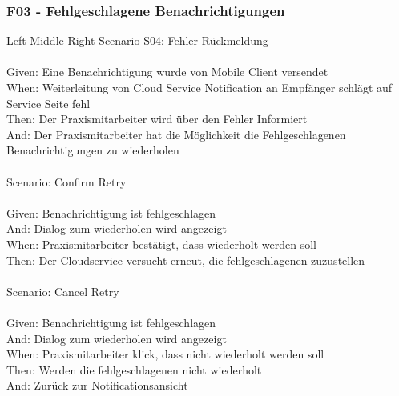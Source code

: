\clearpage
\subsubsection*{F03 - Fehlgeschlagene Benachrichtigungen}

\begin{tabbing}
    Left \= Middle \= Right \kill
    Scenario S04: \> \>  Fehler Rückmeldung\\ \\
    Given: \> \>   Eine Benachrichtigung wurde von Mobile Client versendet\\
    When: \> \>    Weiterleitung von Cloud Service Notification an Empfänger schlägt auf Service Seite fehl\\
    Then: \> \>    Der Praxismitarbeiter wird über den Fehler Informiert\\
    And: \> \>     Der Praxismitarbeiter hat die Möglichkeit die Fehlgeschlagenen Benachrichtigungen zu wiederholen\\
    \\
    Scenario: \> \>  Confirm Retry\\ \\
    Given: \> \>   Benachrichtigung ist fehlgeschlagen\\
    And: \> \>     Dialog zum wiederholen wird angezeigt\\
    When: \> \>    Praxismitarbeiter bestätigt, dass wiederholt werden soll\\
    Then: \> \>    Der Cloudservice versucht erneut, die fehlgeschlagenen zuzustellen\\
    \\
    Scenario: \> \>  Cancel Retry\\ \\
    Given: \> \>   Benachrichtigung ist fehlgeschlagen\\
    And: \> \>     Dialog zum wiederholen wird angezeigt\\
    When: \> \>    Praxismitarbeiter klick, dass nicht wiederholt werden soll\\
    Then: \> \>    Werden die fehlgeschlagenen nicht wiederholt\\
    And: \> \>     Zurück zur Notificationsansicht\\

\end{tabbing}

